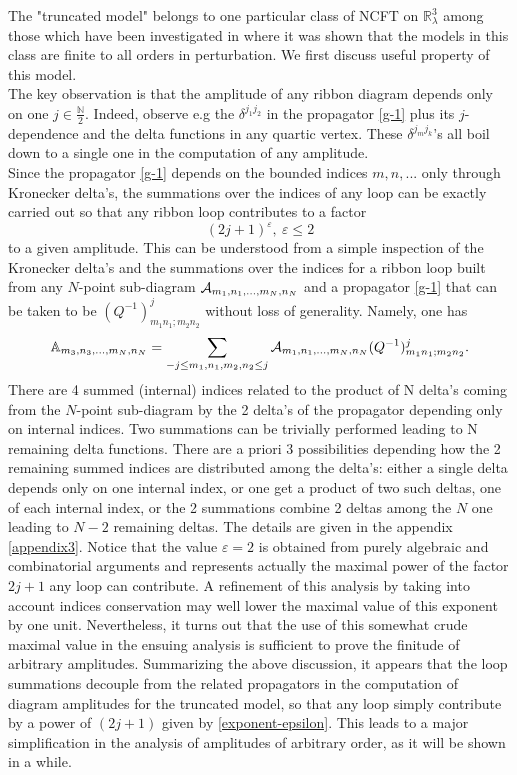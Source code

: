 \documentclass[a4paper,11pt,twoside]{article}
\numberwithin{equation}{section}
\theoremstyle{nonumberplain}
\newcounter{and}
\begin{document}
The "truncated model" belongs to one particular class of NCFT on $\mathbb{R}^3_\lambda$ among those which have been investigated in \cite{vit-wal-12} where it was shown that the models in this class are finite to all orders in perturbation. We first discuss useful property of this model.\\
The key observation is that the amplitude of any ribbon diagram depends only on one $j\in\frac{\mathbb{N}}{2}$. Indeed, observe e.g the $\delta^{j_1j_2}$ in the propagator \eqref{g-1} plus its $j$-dependence and the delta functions in any quartic vertex. These $\delta^{j_mj_k}$'s all boil down to a single one in the computation of any amplitude.\\

Since the propagator \eqref{g-1} depends on the bounded indices $m,n,...$ only through Kronecker delta's, the summations over the indices of any loop can be exactly carried out so that any ribbon loop contributes to a factor 
\begin{equation}
(2j+1)^\varepsilon,\ \varepsilon\le2 \label{exponent-epsilon}
\end{equation}
to a given amplitude. This can be understood from a simple inspection of the Kronecker delta's and the summations over the indices for a ribbon loop built from any $N$-point sub-diagram ${\cal{A}}_{m_1,n_1,...,m_N,n_N}$ and a propagator \eqref{g-1} that can be taken to be $(Q^{-1})^j_{m_1n_1;m_2n_2}$ without loss of generality. Namely, one has
\begin{equation}
\mathbb{A}_{m_3,n_3,...,m_N,n_N}=\sum_{-j\le m_1,n_1,m_2,n_2\le j}{\cal{A}}_{m_1,n_1,...,m_N,n_N}(Q^{-1})^j_{m_1n_1;m_2n_2}\label{loop-sums}.
\end{equation}
There are 4 summed (internal) indices related to the product of N delta's 
coming from the $N$-point sub-diagram by the 2 delta's of the propagator depending only on internal indices. Two summations 
can be trivially performed leading to N remaining delta functions. There are a priori 3 possibilities depending how the 2 remaining summed indices are distributed among the delta's: either a single delta depends only on one internal index, or one get a product of two such deltas, one of each internal index, or
the 2 summations combine 2 deltas among the $N$ one leading to $N-2$ remaining deltas. The details are given in the appendix \ref{appendix3}. Notice that the value $\varepsilon=2$ is obtained from purely algebraic and combinatorial arguments and represents actually the maximal power of the factor $2j+1$ any loop can contribute. A refinement of this analysis by taking into account indices conservation may well lower the maximal value of this exponent by one unit. Nevertheless, it turns out that the use of this somewhat crude maximal value in the ensuing analysis is sufficient to prove the finitude of arbitrary amplitudes. Summarizing the above discussion, it appears that the loop summations decouple from the related propagators in the computation of diagram amplitudes for the truncated model, so that any loop simply contribute by a power of $(2j+1)$ given by \eqref{exponent-epsilon}. This leads to a major simplification in the analysis of amplitudes of arbitrary order, as it will be shown in a while.\par
\end{document}
